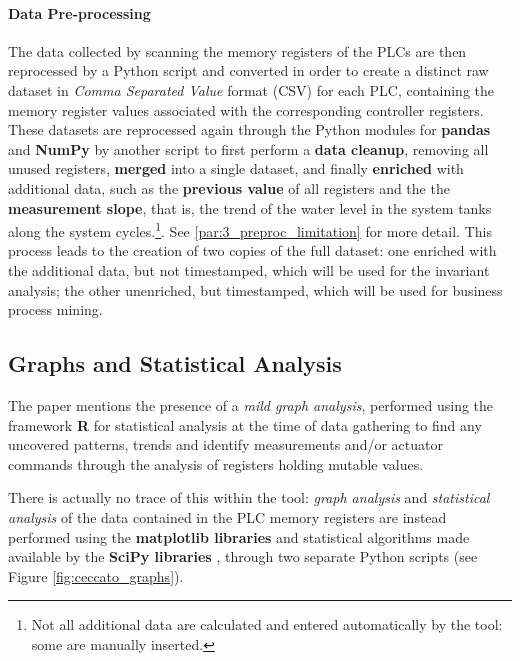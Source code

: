 \paragraph{Data Pre-processing}
\label{par:3_preproc} 
The data collected by scanning the memory registers of the PLCs are then reprocessed by a Python script and converted in order to create a distinct raw dataset in \textit{Comma Separated Value} format (CSV) for each PLC, containing the memory register values associated with the corresponding controller registers. These datasets are reprocessed again through the Python modules for \textbf{pandas} \cite{pandas} and \textbf{NumPy} \cite{numpy} by another script to first perform a \textbf{data cleanup}, removing all unused registers, \textbf{merged} into a single dataset, and finally \textbf{enriched} with additional data, such as the \textbf{previous value} of all registers and the the \textbf{measurement slope}, that is, the trend of the water level in the system tanks along the system cycles.\footnote{Not all additional data are calculated and entered automatically by the tool: some are manually inserted.}. See \ref{par:3_preproc_limitation} for more detail.\newline \newline
This process leads to the creation of two copies of the full dataset: one enriched with the additional data, but not timestamped, which will be used for the invariant analysis; the other unenriched, but timestamped, which will be used for business process mining.

\subsection{Graphs and Statistical Analysis}
\label{subsec:3_graph_analysis}
The paper mentions the presence of a \textit{mild graph analysis}, performed using the framework \textbf{R} \cite{r-project} for statistical analysis at the time of data gathering to find any uncovered patterns, trends and identify measurements and/or actuator commands through the analysis of registers holding mutable values. 

\bigskip
There is actually no trace of this within the tool: \textit{graph analysis} and \textit{statistical analysis} of the data contained in the PLC memory registers are instead performed using the \textbf{matplotlib libraries} and statistical algorithms made available by the \textbf{SciPy libraries} \cite{scipy}, through two separate Python scripts (see Figure \ref{fig:ceccato_graphs}).

